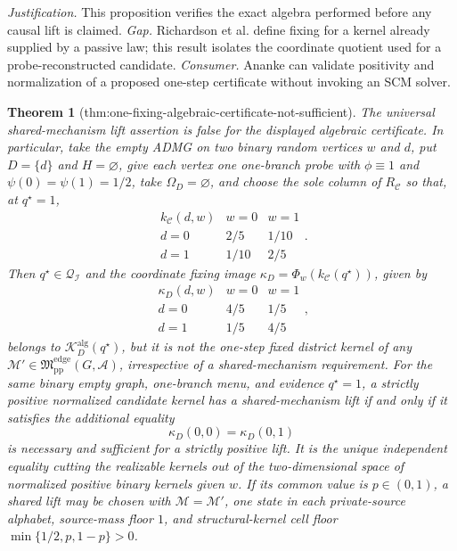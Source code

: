 \documentclass{article}
\newtheorem{theorem}{Theorem}
\begin{document}
\par\smallskip\noindent \textit{Justification.} This proposition verifies the exact algebra performed before any causal lift is claimed. \textit{Gap.} Richardson et al. define fixing for a kernel already supplied by a passive law; this result isolates the coordinate quotient used for a probe-reconstructed candidate. \textit{Consumer.} Ananke can validate positivity and normalization of a proposed one-step certificate without invoking an SCM solver.

\begin{theorem}[thm:one-fixing-algebraic-certificate-not-sufficient]\label{thm:one-fixing-algebraic-certificate-not-sufficient}
The universal shared-mechanism lift assertion is false for the displayed algebraic certificate.  In particular, take the empty ADMG on two binary random vertices \(w\) and \(d\), put \(D=\{d\}\) and \(H=\varnothing\), give each vertex one one-branch probe with \(\phi\equiv1\) and \(\psi(0)=\psi(1)=1/2\), take \(\Omega_D=\varnothing\), and choose the sole column of \(R_{\mathcal C}\) so that, at \(q^{\star}=1\),
\[
\begin{array}{c|cc}
k_{\mathcal C}(d,w)&w=0&w=1\\ \hline
d=0&2/5&1/10\\
d=1&1/10&2/5
\end{array}.
\]
Then \(q^{\star}\in\mathcal Q_{\mathcal I}\) and the coordinate fixing image \(\kappa_D=\Phi_w(k_{\mathcal C}(q^{\star}))\), given by
\[
\begin{array}{c|cc}
\kappa_D(d,w)&w=0&w=1\\ \hline
d=0&4/5&1/5\\
d=1&1/5&4/5
\end{array},
\]
belongs to \(\mathcal K_D^{\mathrm{alg}}(q^{\star})\), but it is not the one-step fixed district kernel of any \(\mathcal M'\in\mathfrak M_{\mathrm{pp}}^{\mathrm{edge}}(G,\mathcal A)\), irrespective of a shared-mechanism requirement.  For the same binary empty graph, one-branch menu, and evidence \(q^{\star}=1\), a strictly positive normalized candidate kernel has a shared-mechanism lift if and only if it satisfies the additional equality
\[
 \kappa_D(0,0)=\kappa_D(0,1)
\]
is necessary and sufficient for a strictly positive lift.  It is the unique independent equality cutting the realizable kernels out of the two-dimensional space of normalized positive binary kernels given \(w\).  If its common value is \(p\in(0,1)\), a shared lift may be chosen with \(\mathcal M=\mathcal M'\), one state in each private-source alphabet, source-mass floor \(1\), and structural-kernel cell floor \(\min\{1/2,p,1-p\}>0\).
\end{theorem}
\end{document}
